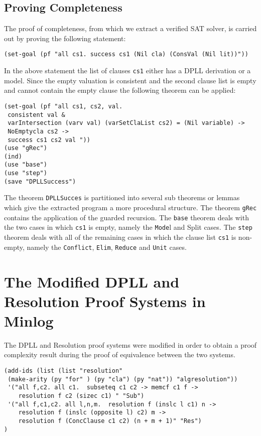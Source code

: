 \subsection*{Proving Completeness}
The proof of completeness, from which we extract a verified SAT solver, is carried out by proving the following statement:

\begin{center}
\texttt{(set-goal (pf "all cs1. success cs1 (Nil cla) (ConsVal (Nil lit))"))}
\end{center}

In the above statement the list of clauses \texttt{cs1} either has a DPLL derivation or a model. Since the empty valuation is consistent and the second clause list is empty and cannot contain the empty clause the following theorem can be applied:


\begin{lstlisting}
(set-goal (pf "all cs1, cs2, val.  
 consistent val & 
 varIntersection (varv val) (varSetClaList cs2) = (Nil variable) -> 
 NoEmptycla cs2 ->  
 success cs1 cs2 val "))
(use "gRec")
(ind)
(use "base")
(use "step")
(save "DPLLSuccess")
\end{lstlisting}

The theorem \texttt{DPLLSucces} is partitioned into several sub theorems or lemmas which give the extracted program a more procedural structure. The theorem \texttt{gRec} contains the application of the guarded recursion.  The \texttt{base} theorem deals with the two cases in which \texttt{cs1} is empty, namely the \texttt{Mode}l and Split cases. The \texttt{step} theorem deals with all of the remaining cases in which the clause list \texttt{cs1} is non-empty, namely the \texttt{Conflict}, \texttt{Elim}, \texttt{Reduce} and \texttt{Unit} cases.


\section{The Modified DPLL and  Resolution Proof Systems in Minlog}
The DPLL and Resolution proof systems were modified in order to obtain a proof complexity result during the proof of equivalence between the two systems.


\begin{lstlisting}
(add-ids (list (list "resolution" 
 (make-arity (py "for" ) (py "cla") (py "nat")) "algresolution"))
 '("all f,c2. all c1.  subseteq c1 c2 -> memcf c1 f -> 
    resolution f c2 (sizec c1) " "Sub")
 '("all f,c1,c2. all l,n,m.  resolution f (inslc l c1) n -> 
    resolution f (inslc (opposite l) c2) m -> 
    resolution f (ConcClause c1 c2) (n + m + 1)" "Res")
)
\end{lstlisting}

